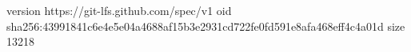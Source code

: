 version https://git-lfs.github.com/spec/v1
oid sha256:43991841c6e4e5e04a4688af15b3e2931cd722fe0fd591e8afa468eff4c4a01d
size 13218
